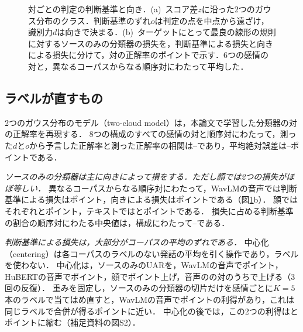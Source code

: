 \begin{figure}[t]
\centering
{}
\caption{対ごとの判定の判断基準と向き．(a)~スコア差$z$に沿った2つのガウス分布のクラス．判断基準のずれ$o$は判定の点を中点から遠ざけ，識別力$d$は向きで決まる．(b)~ターゲットにとって最良の線形の規則に対するソースのみの分類器の損失を，判断基準による損失と向きによる損失に分けて，対の正解率のポイントで示す．6つの感情の対と，異なるコーパスからなる順序対にわたって平均した．}
\label{fig:twocloud}
\end{figure}

\subsection{ラベルが直すもの}
\label{sec:part1-fix}

2つのガウス分布のモデル（two-cloud model）は，本論文で学習した分類器の対の正解率を再現する．
8つの構成のすべての感情の対と順序対にわたって，測った$d$と$o$から予言した正解率と測った正解率の相関は--であり，平均絶対誤差は--ポイントである．

\emph{ソースのみの分類器は主に向きによって損をする．ただし顔では2つの損失がほぼ等しい．}
異なるコーパスからなる順序対にわたって，WavLMの音声では判断基準による損失はポイント，向きによる損失はポイントである（図\ref{fig:twocloud}b）．
顔ではそれぞれとポイント，テキストではとポイントである．
損失に占める判断基準の割合の順序対にわたる中央値は，構成にわたって--である．

\emph{判断基準による損失は，大部分がコーパスの平均のずれである．}
中心化（centering）は各コーパスのラベルのない発話の平均を引く操作であり，ラベルを使わない．
中心化は，ソースのみのUARを，WavLMの音声でポイント，HuBERTの音声でポイント，顔でポイント上げ，音声のの対のうちで上げる（3回の反復）．
重みを固定し，ソースのみの分類器の切片だけを感情ごとに$K=5$本のラベルで当てはめ直すと，WavLMの音声でポイントの利得があり，これは同じラベルで合併が得るポイントに近い．
中心化の後では，この2つの利得はとポイントに縮む（補足資料の図S2）．

